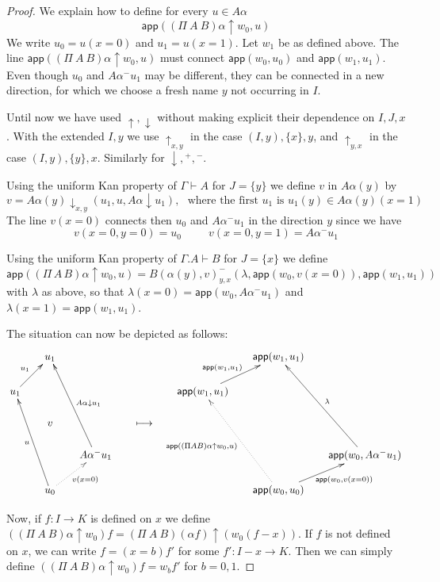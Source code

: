 \documentclass[10pt,a4paper]{article}
\newcommand{\app}{\mathsf{app}}
\newcommand{\set}[1]{\{#1\}}
\newcommand{\lto}{\longmapsto}
\newcommand{\rup}[1]{#1{\uparrow}}
\newcommand{\rdo}[1]{#1{\downarrow}}
\newcommand{\rupxy}[1]{#1{\uparrow_{x,y}}}
\newcommand{\rdoxy}[1]{#1{\downarrow_{x,y}}}
\newcommand{\rupyx}[1]{#1{\uparrow_{y,x}}}
\begin{document}
\begin{proof}
  We explain how to define for every $u\in A\alpha$
  $$
  \app(\rup{(\Pi~A~B)\alpha} w_0,u)
  $$
  We write $u_0 = u(x=0)$ and $u_1 = u(x=1)$.  Let $w_1$ be as defined
  above.  The line $\app((\Pi~A~B)\alpha\uparrow w_0,u)$ must connect
  $\app(w_0,u_0)$ and $\app(w_1,u_1)$.  Even though $u_0$ and
  $A\alpha^- u_1$ may be different, they can be connected in a new
  direction, for which we choose a fresh name $y$ not occurring in
  $I$.

  Until now we have used $\rup{},\rdo{}$ without making explicit their
  dependence on $I,J,x$. With the extended $I,y$ we use $\rupxy{}$ in
  the case $(I,y),\set{x},y$, and $\rupyx{}$ in the case
  $(I,y),\set{y},x$. Similarly for $\rdo{},{}^+,{}^-$.

  Using the uniform Kan property of $\Gamma\vdash A$ for $J=\set{y}$
  we define $v$ in $A\alpha(y)$ by
  $$
  v = \rdoxy{A\alpha(y)}(u_1,u,\rdo{A\alpha} u_1),~~~\text{where the
    first $u_1$ is $u_1(y) \in A\alpha(y)(x=1)$}
  $$
  The line $v(x=0)$ connects then $u_0$ and $A\alpha^-u_1$ in the
  direction $y$ since we have
  $$
  v(x=0,y=0) = u_0~~~~~~~~~~~v(x=0,y=1) = A\alpha^- u_1
  $$

  Using the uniform Kan property of $\Gamma.A\vdash B$ for $J=\set{x}$
  we define
  $$
  \app(\rup{(\Pi\,A\,B)\alpha} w_0,u) =
  {B(\alpha(y),v)}^-_{y,x}(\lambda,\app(w_0,v(x=0)),\app(w_1,u_1))
  $$
  with $\lambda$ as above, so that $\lambda(x=0) = \app(w_0,A\alpha^-
  u_1)$ and $\lambda(x=1) = \app(w_1,u_1)$.

  The situation can now be depicted as follows:
  \[
  \xymatrix@R=.6cm@C=.6cm{
    &u_1&                                                                          &&  &\app(w_1,u_1)&\\
    u_1\ar[ur]^{u_1}&&                                               &&  \app(w_1,u_1)\ar[ur]^{ \app(w_1,u_1)~~~}&&\\
    &v&                                                                          &\lto& &   &\\
    &&A\alpha^- u_1\ar[uuul]_{\rdo{A\alpha}u_1}     &&  &&\app(w_0,A\alpha^- u_1)\ar[uuul]_{\lambda} \\
    &u_0\ar[uuul]^u \ar@{.>}[ur]_{v(x=0)}&                 &&  &\app(w_0,u_0)\ar@{.>}[uuul]^{\app(\rup{(\Pi A B)\alpha} w_0,u)} \ar[ur]_{~~~~\app(w_0,v(x=0))}&\\
  }
  \]

  Now, if $f:I\to K$ is defined on $x$ we define
  $(\rup{(\Pi~A~B)\alpha} w_0) f = \rup{(\Pi~A~B)(\alpha f)} (w_0
  (f-x))$.  If $f$ is not defined on $x$, we can write $f=(x=b)f'$ for
  some $f':I-x \to K$.  Then we can simply define
  $(\rup{(\Pi~A~B)\alpha} w_0) f = w_b f'$ for $b=0,1$.
\end{proof}
\end{document}
